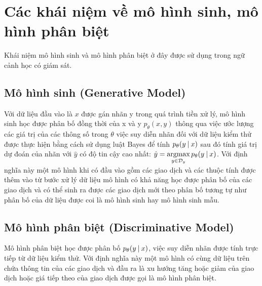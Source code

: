 \section{Các khái niệm về mô hình sinh, mô hình phân biệt}
Khái niệm mô hình sinh và mô hình phân biệt ở đây được sử dụng trong ngữ cảnh học có giám sát.
\subsection{Mô hình sinh (Generative Model)}
Với dữ liệu đầu vào là $x$ được gán nhãn y trong quá trình tiền xử lý, mô hình sinh học được phân bố đồng thời của x và y $p_\theta(x,y)$ thông qua việc ước lượng các giá trị của các thông số trong $\theta$ việc suy diễn nhãn đối với dữ liệu kiểm thử được thực hiện bằng cách sử dụng luật Bayes\cite{gen-vs-dis} để tính $p_\theta(y\:\lvert\: x)$ sau đó tính giá trị dự đoán của nhãn với $\hat{y}$ có độ tin cậy cao nhất:
$\hat{y} = \operatorname*{argmax}\limits_{y \in \mathcal{D}_y} p_\theta(y\:\lvert\: x)$. Với định nghĩa này một mô hình khi có đầu vào gồm các giao dịch và các thuộc tính được thêm vào từ bước xử lý dữ liệu mô hình có khả năng học được phân bố của các giao dịch và có thể sinh ra được các giao dịch mới theo phân bố tương tự như phân bố của dữ liệu được coi là mô hình sinh hay mô hình sinh mẫu.
\subsection{Mô hình phân biệt (Discriminative Model)}
Mô hình phân biệt học được phân bố $p_\theta(y \:\lvert\: x)$, việc suy diễn nhãn được tính trực tiếp từ dữ liệu kiểm thử. Với định nghĩa này một mô hình có cùng dữ liệu trên chứa thông tin của các giao dịch và đầu ra là xu hướng tăng hoặc giảm của giao dịch hoặc giá tiếp theo của giao dịch được gọi là mô hình phân biệt.

